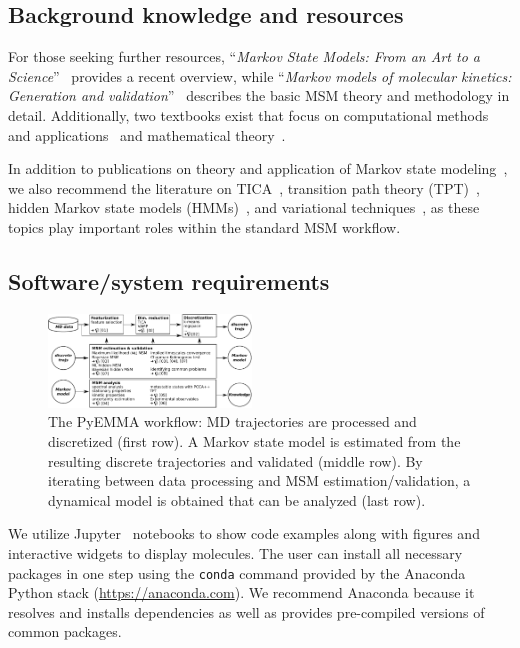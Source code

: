 \documentclass[9pt,tutorial]{livecoms}
\begin{document}
\subsection{Background knowledge and resources}
\label{sec:background}

For those seeking further resources, ``\emph{Markov State Models: From an Art to a Science}''~\cite{msm-brooke} provides a recent overview, while ``\emph{Markov models of molecular kinetics: Generation and validation}''~\cite{msm-jhp} describes the basic MSM theory and methodology in detail.
Additionally, two textbooks exist that focus on computational methods and applications~\cite{msm-book} and mathematical theory~\cite{schuette-sarich-book}.

In addition to publications on theory and application of Markov state modeling~\cite{schuette-msm,buchete-msm-2008,noe-tmat-sampling,bowman-msm-2009,noe-folding-pathways,sarich-msm-quality,noe-fingerprints,noe-dy-neut-scatt,Chodera2014,ben-rev-msm,simon-mech-mod-nmr,oom-feliks,simon-amm},
we also recommend the literature on TICA~\cite{tica,tica3,tica2,kinetic-maps}, transition path theory (TPT)~\cite{weinan-tpt,metzner-msm-tpt},
hidden Markov state models (HMMs)~\cite{noe-proj-hid-msm,hmm-baum-welch-alg,hmm-tutorial}, and variational techniques~\cite{noe-vac,vamp-preprint,gmrq}, as these topics play important roles within the standard MSM workflow.

\subsection{Software/system requirements}

\begin{figure}
\includegraphics[width=0.48\textwidth]{figure_1}
\caption{The PyEMMA workflow: MD trajectories are processed and discretized (first row). A Markov state model is estimated from the resulting discrete trajectories and validated (middle row). By iterating between data processing and MSM estimation/validation, a dynamical model is obtained that can be analyzed (last row).}
\label{fig:workflowchart}
\end{figure}

We utilize Jupyter~\cite{jupyter} notebooks to show code examples along with figures and interactive widgets to display molecules.
The user can install all necessary packages in one step using the \texttt{conda} command provided by the Anaconda Python stack (\url{https://anaconda.com}).
We recommend Anaconda because it resolves and installs dependencies as well as provides pre-compiled versions of common packages.
\end{document}
